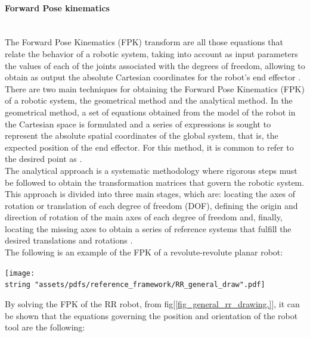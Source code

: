 \documentclass[11pt]{report} %
\newcommand{\subsubsubsection}[1]{\paragraph{#1}\mbox{}\\}
\begin{document}
\subsubsubsection{Forward Pose kinematics}

The Forward Pose Kinematics (FPK) transform are all those equations that relate the behavior of a robotic system, taking into account as input parameters the values of each of the joints associated with the degrees of freedom, allowing to obtain as output the absolute Cartesian coordinates for the robot's end effector \citep{cite_craig_robotics}.\\

There are two main techniques for obtaining the Forward Pose Kinematics (FPK) of a robotic system, the geometrical method and the analytical method. In the geometrical method, a set of equations obtained from the model of the robot in the Cartesian space is formulated and a series of expressions is sought to represent the absolute spatial coordinates of the global system, that is, the expected position of the end effector. For this method, it is common to refer to the desired point as  \citep{cite_craig_robotics}.\\

The analytical approach is a systematic methodology where rigorous steps must be followed to obtain the transformation matrices that govern the robotic system. This approach is divided into three main stages, which are: locating the axes of rotation or translation of each degree of freedom (DOF), defining the origin and direction of rotation of the main axes of each degree of freedom and, finally, locating the missing axes to obtain a series of reference systems that fulfill the desired translations and rotations \citep{cite_barrientos_robotics_book}.\\

The following is an example of the FPK of a revolute-revolute planar robot:

\begin{center}
\texttt{[image: \\string "assets/pdfs/reference\_framework/RR\_general\_draw".pdf]}
\bigbreak
\begin{minipage}{\linewidth} %
\label{fig_general_rr_drawing.}
\end{minipage} \end{center}

By solving the FPK of the RR robot, from fig[\ref{fig_general_rr_drawing.}], it can be shown that the equations governing the position and orientation of the robot tool are the following:
\end{document}
